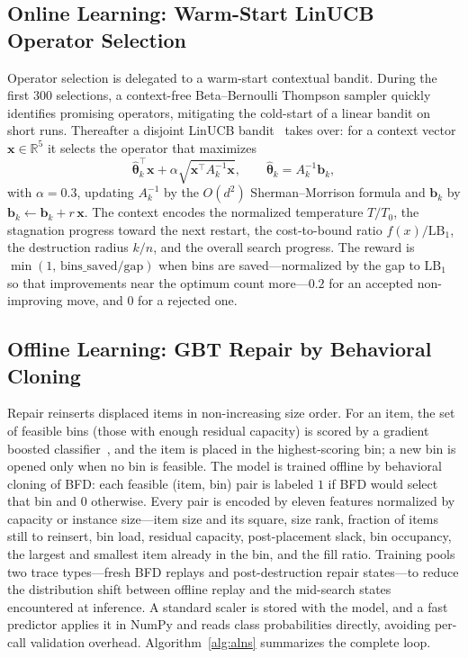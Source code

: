 \documentclass[conference]{IEEEtran}
\begin{document}
\subsection{Online Learning: Warm-Start LinUCB Operator Selection}
Operator selection is delegated to a warm-start contextual bandit. During the
first $300$ selections, a context-free Beta--Bernoulli Thompson sampler quickly
identifies promising operators, mitigating the cold-start of a linear bandit on
short runs. Thereafter a disjoint LinUCB bandit~\cite{bChu} takes over: for a
context vector $\mathbf{x}\in\mathbb{R}^5$ it selects the operator that maximizes
\begin{equation}
	\hat{\boldsymbol{\theta}}_k^\top \mathbf{x}
	+ \alpha\sqrt{\mathbf{x}^\top A_k^{-1}\mathbf{x}},
	\qquad \hat{\boldsymbol{\theta}}_k=A_k^{-1}\mathbf{b}_k,\label{eq:ucb}
\end{equation}
with $\alpha=0.3$, updating $A_k^{-1}$ by the $O(d^2)$ Sherman--Morrison formula
and $\mathbf{b}_k$ by $\mathbf{b}_k\leftarrow\mathbf{b}_k+r\,\mathbf{x}$. The
context encodes the normalized temperature $T/T_0$, the stagnation progress toward
the next restart, the cost-to-bound ratio $f(x)/\mathrm{LB}_1$, the destruction
radius $k/n$, and the overall search progress. The reward is
$\min(1,\,\text{bins\_saved}/\text{gap})$ when bins are saved---normalized by the
gap to $\mathrm{LB}_1$ so that improvements near the optimum count more---$0.2$ for
an accepted non-improving move, and $0$ for a rejected one.

\subsection{Offline Learning: GBT Repair by Behavioral Cloning}
Repair reinserts displaced items in non-increasing size order. For an item, the
set of feasible bins (those with enough residual capacity) is scored by a gradient
boosted classifier~\cite{bFriedman}, and the item is placed in the highest-scoring
bin; a new bin is opened only when no bin is feasible. The model is trained offline
by behavioral cloning of BFD: each feasible (item, bin) pair is labeled $1$ if BFD
would select that bin and $0$ otherwise. Every pair is encoded by eleven features
normalized by capacity or instance size---item size and its square, size rank,
fraction of items still to reinsert, bin load, residual capacity, post-placement
slack, bin occupancy, the largest and smallest item already in the bin, and the
fill ratio. Training pools two trace types---fresh BFD replays and
post-destruction repair states---to reduce the distribution shift between offline
replay and the mid-search states encountered at inference. A standard scaler is
stored with the model, and a fast predictor applies it in NumPy and reads class
probabilities directly, avoiding per-call validation overhead. Algorithm~\ref{alg:alns}
summarizes the complete loop.
\end{document}
